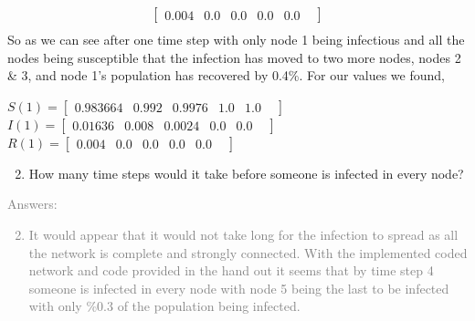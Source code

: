 \documentclass[11pt]{article}
\begin{document}
{\begin{enumerate}
\begin{align*}
\begin{bmatrix}
		0.004    	&
		0.0    		&
		0.0 		&
		0.0 		&
		0.0 		&
		\end{bmatrix}\\
\end{align*}
So as we can see after one time step with only node 1 being infectious and all the nodes being susceptible that the infection has moved to two more nodes, nodes 2 \& 3, and node 1's population has recovered by 0.4\%. For our values we found,\\
\begin{center}
 	$S(1)=\begin{bmatrix} 
		0.983664    &
		0.992    	&
		0.9976 	&
		1.0 		&
		1.0 		&
	\end{bmatrix}$\\
 	$I(1)=\begin{bmatrix} 
		0.01636    	&
		0.008  	&
		0.0024	&
		0.0 		&
		0.0 		&
	\end{bmatrix}$\\
 	$R(1)=\begin{bmatrix} 
		0.004    	&
		0.0    		&
		0.0 		&
		0.0 		&
		0.0 		&
	\end{bmatrix}$\\
\end{center}
\end{enumerate}
}

\begin{enumerate}
	\setcounter{enumi}{1}
	\item How many time steps would it take before someone is infected in every node?
\end{enumerate}
\textcolor{gray}{
Answers:
\begin{enumerate}
	\setcounter{enumi}{1}
	\item It would appear that it would not take long for the infection to spread as all the network is complete and strongly connected. With the implemented coded network and code provided in the hand out it seems that by time step 4 someone is infected in every node with node 5 being the last to be infected with only \%0.3 of the population being infected.   
\end{enumerate}
}
\end{document}
